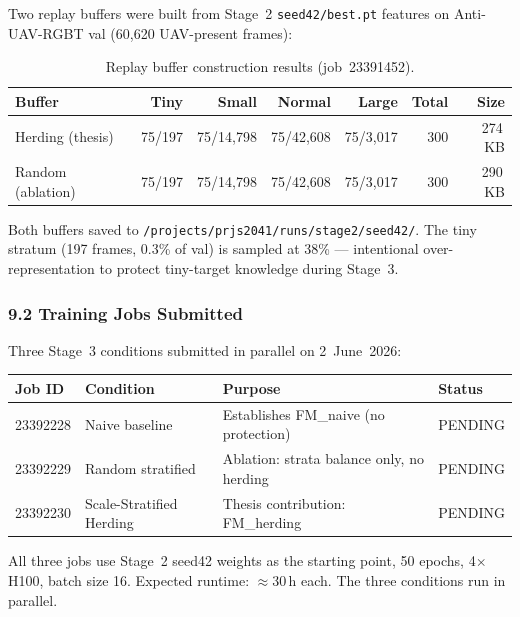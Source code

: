 Two replay buffers were built from Stage~2 \texttt{seed42/best.pt}
features on Anti-UAV-RGBT val (60,620 UAV-present frames):

\begin{table}[h]
\centering
\caption{Replay buffer construction results (job~23391452).}
\label{tab:buffers}
\small
\begin{tabular}{lrrrrrr}
\hline
\textbf{Buffer} & \textbf{Tiny} & \textbf{Small} & \textbf{Normal} & \textbf{Large} & \textbf{Total} & \textbf{Size} \\
\hline
Herding (thesis)   & 75/197 & 75/14,798 & 75/42,608 & 75/3,017 & 300 & 274\,KB \\
Random (ablation)  & 75/197 & 75/14,798 & 75/42,608 & 75/3,017 & 300 & 290\,KB \\
\hline
\end{tabular}
\end{table}

\noindent Both buffers saved to
\texttt{/projects/prjs2041/runs/stage2/seed42/}. The tiny stratum
(197 frames, 0.3\% of val) is sampled at 38\% — intentional
over-representation to protect tiny-target knowledge during Stage~3.

\subsubsection*{9.2 Training Jobs Submitted}

Three Stage~3 conditions submitted in parallel on 2~June~2026:

\begin{center}\small
\begin{tabular}{llll}
\hline
\textbf{Job ID} & \textbf{Condition} & \textbf{Purpose} & \textbf{Status} \\
\hline
23392228 & Naive baseline       & Establishes FM\_naive (no protection)      & PENDING \\
23392229 & Random stratified    & Ablation: strata balance only, no herding  & PENDING \\
23392230 & Scale-Stratified Herding & Thesis contribution: FM\_herding         & PENDING \\
\hline
\end{tabular}
\end{center}

\noindent All three jobs use Stage~2 seed42 weights as the starting
point, 50 epochs, 4$\times$H100, batch size 16. Expected runtime:
$\approx$30\,h each. The three conditions run in parallel.

